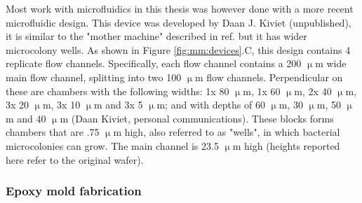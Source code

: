 % 
%
%
%


Most work with microfluidics in this thesis was however done with a more recent microfluidic design.
This device was developed by Daan J. Kiviet (unpublished), it is similar to the "mother machine" described in ref. \cite{Taheri-Araghi2014} but it has wider microcolony wells. As shown in Figure \ref{fig:mm:devices}.C, this design contains 4 replicate flow channels.
Specifically, each flow channel contains a 200 $\upmu$m wide main flow channel, splitting into two 100 $\upmu$m flow channels. 
Perpendicular on these are chambers with the following widths: 
1x 80 $\upmu$m, 
1x 60 $\upmu$m, 
2x 40 $\upmu$m, 
3x 20 $\upmu$m, 
3x 10 $\upmu$m and 
3x 5 $\upmu$m; and with depths of 60 $\upmu$m, 30 $\upmu$m, 50 $\upmu$m and 40 $\upmu$m (Daan Kiviet, personal communications).
These blocks forms chambers that are .75 $\upmu$m high, also referred to as "wells", in which bacterial microcolonies can grow. The main channel is 23.5 $\upmu$m high (heights reported here refer to the original wafer).

\subsubsection{Epoxy mold fabrication}

